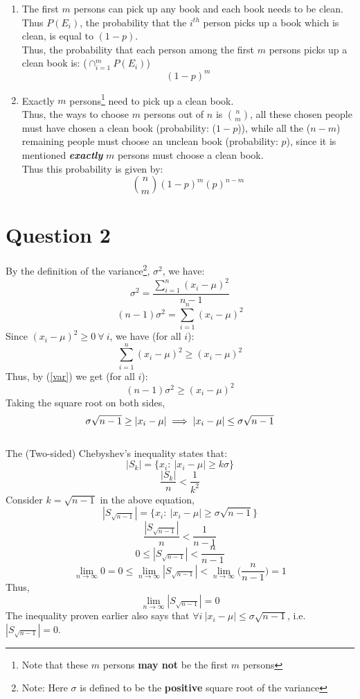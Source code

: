 \documentclass[11pt]{article}
\begin{document}
\begin{enumerate}[label=(\alph*)]
    \item The first $m$ persons can pick up any book and each book needs to be clean. Thus $P(E_i)$, the probability that the $i^{th}$ person picks up a book which is clean, is equal to $(1-p)$.\\
          Thus, the probability that each person among the first $m$ persons picks up a clean book is: ($ \cap_{i=1}^{m} P(E_i) $)
          $$ (1-p)^m $$

    \item Exactly $m$ persons\footnote{Note that these $m$ persons \textbf{may not} be the first $m$ persons} need to pick up a clean book.\\
          Thus, the ways to choose $m$ persons out of $n$ is ${n\choose m}$, all these chosen people must have chosen a clean book (probability: ($1-p$)), while all the ($ n-m $) remaining people must choose an unclean book (probability: $p$), since it is mentioned \textbf{\textit{exactly}} $m$ persons must choose a clean book.\\
          Thus this probability is given by:
          $$ {n\choose m} (1-p)^m (p)^{n-m} $$

\end{enumerate}



\newpage
\section*{Question 2}
\setcounter{equation}{0}
By the definition of the variance\footnote{Note: Here $\sigma$ is defined to be the \textbf{positive} square root of the variance}, $\sigma^2$, we have:
$$ \sigma^2 = \frac{\sum_{i=1}^n (x_i - \mu)^2}{n-1} $$
\begin{equation}
    \label{var}
    (n-1)\sigma^2 = \sum_{i=1}^n (x_i - \mu)^2
\end{equation}
Since $(x_i - \mu)^2 \ge 0 \  \forall \ i$, we have (for all $i$):
$$ \sum_{i=1}^n (x_i - \mu)^2 \ge (x_i - \mu)^2  $$
Thus, by (\ref{var}) we get (for all $i$):
$$ (n-1)\sigma^2 \ge (x_i - \mu)^2 $$
Taking the square root on both sides,
$$ \sigma\sqrt{n-1} \ge |x_i - \mu| \implies |x_i - \mu| \le \sigma\sqrt{n-1} \hfill $$
\hfill \qedsymbol \\
\noindent
The (Two-sided) Chebyshev's inequality states that:
$$ |S_k| = \{ x_i : \  |x_i - \mu| \ge k\sigma \} $$
\begin{equation}
    \frac{|S_k|}{n} < \frac{1}{k^2}
\end{equation}
Consider $k = \sqrt{n-1}$ in the above equation,\\
$$ |S_{\sqrt{n-1}}| = \{ x_i : \  |x_i - \mu| \ge \sigma\sqrt{n-1} \} $$
$$ \frac{|S_{\sqrt{n-1}}|}{n} < \frac{1}{n-1} $$
$$ 0 \leq |S_{\sqrt{n-1}}| < \frac{n}{n-1}$$
$$ \lim_{n\to\infty}0=0 \leq \lim_{n\to\infty}|S_{\sqrt{n-1}}| < \lim_{n\to\infty}\bigg( \frac{n}{n-1} \bigg)=1$$
Thus,
$$ \lim_{n\to\infty}|S_{\sqrt{n-1}}| = 0 $$
The inequality proven earlier also says that $\forall i \ |x_i - \mu| \le \sigma \sqrt{n-1}$, i.e. $|S_{\sqrt{n-1}}| = 0$.\\
\end{document}
